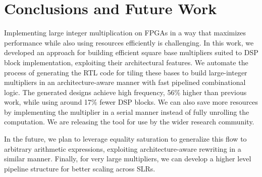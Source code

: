 \documentclass[sigconf,9pt,review]{acmart}
\begin{document}
\section{Conclusions and Future Work}
Implementing large integer multiplication on FPGAs in a way that maximizes performance while also using resources efficiently is challenging.  
In this work, we developed an approach for building efficient square base multipliers suited to DSP block implementation, exploiting their architectural features. 
We automate the process of generating the RTL code for tiling these bases to build large-integer multipliers in an architecture-aware manner with fast pipelined combinational logic.
The generated designs achieve high frequency, 56\% higher than previous work, while using around 17\% fewer DSP blocks.
We can also save more resources by implementing the multiplier in a serial manner instead of fully unrolling the computation.
We are releasing the tool for use by the wider research community.

In the future, we plan to leverage equality saturation to generalize this flow to arbitrary arithmetic expressions, exploiting architecture-aware rewriting in a similar manner.
Finally, for very large multipliers, we can develop a higher level pipeline structure for better scaling across SLRs.






\end{document}
